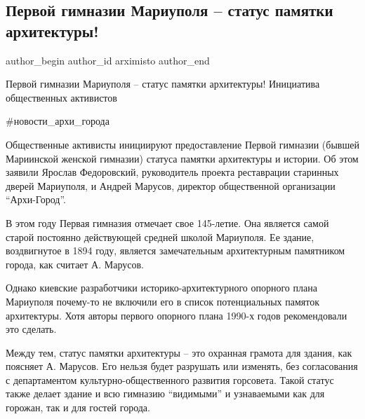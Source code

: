  
 
 
 
 

\subsection{Первой гимназии Мариуполя – статус памятки архитектуры!}
\label{sec:27_04_2021.fb.arximisto.2.pervoj_gimnazii_mrpl_status_pamjatki_initiative}

\ifcmt
 author_begin
   author_id arximisto
 author_end
\fi

Первой гимназии Мариуполя – статус памятки архитектуры! Инициатива общественных
активистов

\#новости\_архи\_города

Общественные активисты инициируют предоставление Первой гимназии (бывшей
Мариинской женской гимназии) статуса памятки архитектуры и истории. Об этом
заявили Ярослав Федоровский, руководитель проекта реставрации старинных дверей
Мариуполя, и Андрей Марусов, директор общественной организации
\enquote{Архи-Город}.

В этом году Первая гимназия отмечает свое 145-летие. Она является самой старой
постоянно действующей средней школой Мариуполя. Ее здание, воздвигнутое в 1894
году, является замечательным архитектурным памятником города, как считает А.
Марусов.

Однако киевские разработчики историко-архитектурного опорного плана Мариуполя
почему-то не включили его в список потенциальных памяток архитектуры. Хотя
авторы первого опорного плана 1990-х годов рекомендовали это сделать.

Между тем, статус памятки архитектуры – это охранная грамота для здания, как
поясняет А. Марусов. Его нельзя будет разрушать или изменять, без согласования с
департаментом культурно-общественного развития горсовета. Такой статус также
делает здание и всю гимназию \enquote{видимыми} и узнаваемыми как для горожан,
так и для гостей города.


